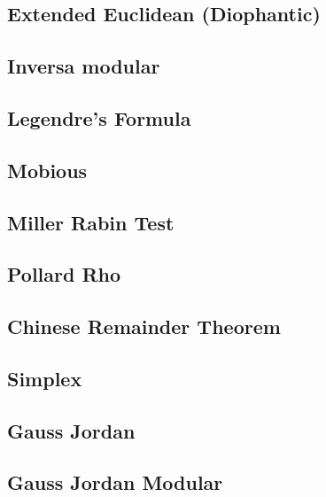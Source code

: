 \subsection{Extended Euclidean (Diophantic)}
\raggedbottom
\hrulefill
\subsection{Inversa modular}
\raggedbottom
\hrulefill
\subsection{Legendre's Formula}
\raggedbottom
\hrulefill
\subsection{Mobious}
\raggedbottom
\hrulefill
\subsection{Miller Rabin Test}
\raggedbottom
\hrulefill
\subsection{Pollard Rho}
\raggedbottom
\hrulefill
\subsection{Chinese Remainder Theorem}
\raggedbottom
\hrulefill
\subsection{Simplex}
\raggedbottom
\hrulefill
\subsection{Gauss Jordan}
\raggedbottom
\hrulefill
\subsection{Gauss Jordan Modular}
\raggedbottom
\hrulefill
